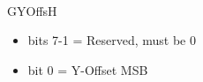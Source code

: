 \\
GYOffsH
\begin{itemize}
\item bits 7-1 = Reserved, must be 0
\item bit 0 = Y-Offset MSB
\end{itemize}

